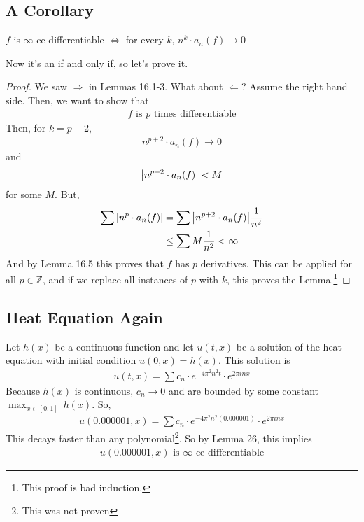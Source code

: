 \subsection{A Corollary}
\begin{lemma}
    $f$ is $\infty$-ce differentiable $\iff$ for every $k$, $n^k \cdot a_n(f) \to 0$
\end{lemma}
\noindent Now it's an if and only if, so let's prove it.
\begin{proof}
    We saw $\Rightarrow$ in Lemmas 16.1-3. What about $\Leftarrow$? Assume the right hand side. Then, we want to show that
    \begin{align}
        f \text{ is $p$ times differentiable}
    \end{align}
    Then, for $k = p + 2$,
    \begin{align}
        n^{p+2} \cdot a_n(f) \to 0
    \end{align}
    and
    \begin{align}
        \abs{n^{p+2} \cdot a_n(f)} < M
    \end{align}
    for some $M$. But,
    \begin{align}
        \sum \abs{n^p \cdot a_n(f)} &= \sum \abs{n^{p+2} \cdot a_n(f)} \frac{1}{n^2}\\
        &\le \sum M \frac{1}{n^2} < \infty
    \end{align}
    And by Lemma 16.5 this proves that $f$ has $p$ derivatives. This can be applied for all $p \in \mathbb{Z}$, and if we replace all instances of $p$ with $k$, this proves the Lemma.\footnote{This proof is bad induction.}
\end{proof}

\subsection{Heat Equation Again}
Let $h(x)$ be a continuous function and let $u(t, x)$ be a solution of the heat equation with initial condition $u(0, x) = h(x)$. This solution is
\begin{align}
    u(t, x) = \sum c_n \cdot e^{-4\pi^2n^2t} \cdot e^{2\pi in x}
\end{align}
Because $h(x)$ is continuous, $c_n \to 0$ and are bounded by some constant $\max_{x\in[0,1]}\:h(x)$. So,
\begin{align}
    u(0.000001, x) = \sum c_n \cdot e^{-4\pi^2n^2(0.000001)} \cdot e^{2\pi in x}
\end{align}
This decays faster than any polynomial\footnote{This was not proven}. So by Lemma 26, this implies
\begin{align}
    u(0.000001, x) \text{ is $\infty$-ce differentiable}
\end{align}

